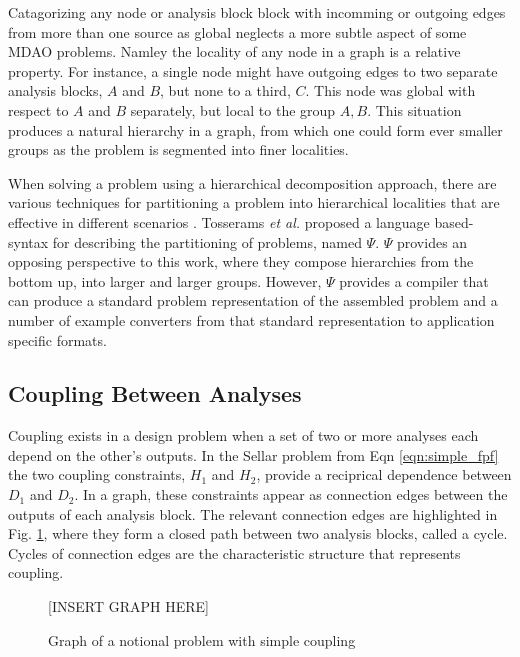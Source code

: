   Catagorizing any node or analysis block block with incomming or outgoing edges
  from more than one source as global neglects a more 
  subtle aspect of some MDAO problems. Namley the locality of any node in a graph is 
  a relative property. For instance, a single node might have outgoing edges 
  to two separate analysis blocks, $A$ and $B$, but none to a third, $C$. This 
  node was global with respect to $A$ and $B$ separately, but local 
  to the group $A,B$. This situation produces a natural hierarchy in a graph, 
  from which one could form ever smaller groups as the problem is segmented into 
  finer localities. 

  When solving a problem using a hierarchical decomposition approach, 
  there are various techniques for partitioning a problem into hierarchical 
  localities that are effective in different scenarios \cite{krishnamachari1997optimal,michelena1997hypergraph,sobieszczanski1997,Perez2004,allison2009optimal}. 
  Tosserams \textit{et al.} proposed a language based-syntax for describing the 
  partitioning of problems, named $\Psi$\cite{tosserams2010specification}. 
  $\Psi$ provides an opposing perspective to this work, where they compose 
  hierarchies from the bottom up, into larger and larger groups. However, 
  $\Psi$ provides a compiler that can produce a standard problem representation 
  of the assembled problem and a number of example converters from that 
  standard representation to application specific formats. 

\subsection{Coupling Between Analyses}

  Coupling exists in a design problem when a set of two or more analyses each depend on the
  other's outputs. In the Sellar problem from Eqn \ref{eqn:simple_fpf} the two 
  coupling constraints, $H_1$ and $H_2$, provide a reciprical dependence between 
  $D_1$ and $D_2$. In a graph, these constraints appear as connection edges between 
  the outputs of each analysis block. The relevant connection edges are highlighted in 
  Fig. \ref{f:coupling}, where they form a closed path between two analysis blocks,
  called a cycle. Cycles of connection edges are the characteristic structure that 
  represents coupling. 

  \begin{figure}
      \begin{center}
      [INSERT GRAPH HERE]
      \caption{Graph of a notional problem with simple coupling \label{f:coupling}}
      \end{center}
  \end{figure}


